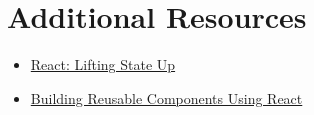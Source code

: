 \section{Additional Resources}

\begin{itemize}[leftmargin=*]
    \item \href{https://reactjs.org/docs/lifting-state-up.html}{React: Lifting State Up}
    \item \href{https://buttercms.com/blog/building-reusable-components-using-react}{Building Reusable Components Using React}
\end{itemize}
